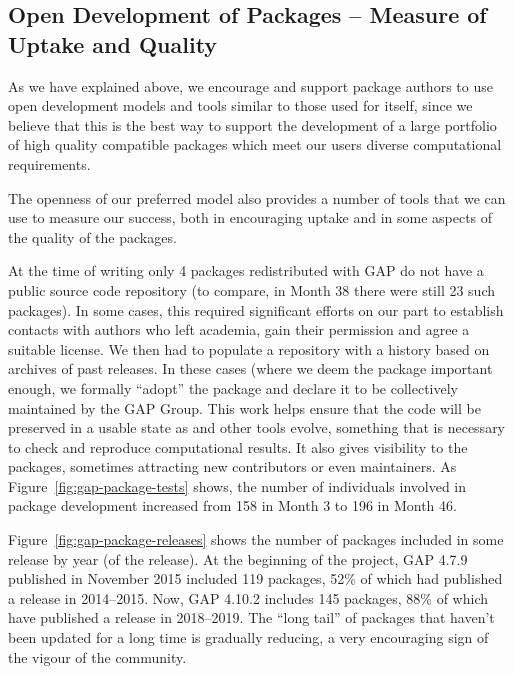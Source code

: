 \subsection{Open Development of \GAP Packages -- Measure of Uptake
  and Quality}

As we have explained above, we encourage and support package authors
to use open development models and tools similar to those used for
\GAP itself, since we believe that this is the best way to support the
development of a large portfolio of high quality compatible packages
which meet our users diverse computational requirements.

The openness of our preferred model also provides a number of tools
that we can use to measure our success, both in encouraging uptake and
in some aspects of the quality of the packages.

At the time of writing only 4 packages redistributed with GAP do not
have a public source code repository (to compare, in Month 38 there
were still 23 such packages). In some cases, this required significant
efforts on our part to establish contacts with authors who left
academia, gain their permission and agree a suitable license. We then
had to  populate a repository with a history based on archives of
past releases. In these cases (where we deem the package important
enough,  we formally ``adopt'' the package and declare it to be collectively maintained
by the GAP Group. This work helps ensure that the code will be
preserved in a usable state as \GAP and other tools evolve, something
that is
necessary to check and reproduce computational results. It also gives
visibility to the packages, sometimes attracting new contributors or
even maintainers. As
Figure~\ref{fig:gap-package-tests} shows, the number of individuals
involved in package development increased from 158 in Month 3 to 196
in Month 46.

Figure~\ref{fig:gap-package-releases} shows the number of \GAP packages
included in some \GAP release by year (of the release).
At the beginning of the project, GAP 4.7.9 published in November
2015 included 119 packages, 52\% of which had published a release in 2014--2015.
Now, GAP 4.10.2 includes 145 packages, 88\% of which have published a
release in 2018--2019. The ``long tail'' of packages that haven't been updated for
a long time is gradually reducing, a very encouraging sign of the
vigour of the community.

